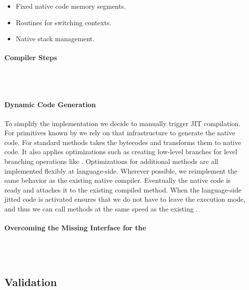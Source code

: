 \begin{itemize}[noitemsep]
	\item Fixed native code memory segments.
	\item Routines for switching contexts.
	\item Native stack management.
\end{itemize}


\paragraph{\NBJ Compiler Steps}
 \\
 \\


\paragraph{Dynamic Code Generation}
To simplify the implementation we decide to manually trigger JIT compilation.
For primitives known by \WF we rely on that infrastructure to generate the native code.
For standard methods \NBJ takes the bytecodes and transforms them to native code.
It also applies optimizations such as creating low-level branches for \ST level branching operations like .
Optimizations for additional methods are all implemented flexibly at language-side.
Wherever possible, we reimplement the same behavior as the existing native \JIT compiler.
Eventually the native code is ready and \B attaches it to the existing compiled method.
When the language-side jitted code is activated \B ensures that we do not have to leave the \JIT execution mode, and thus we can call methods at the same speed as the existing \JIT.


\paragraph{Overcoming the Missing \VM Interface for the \JIT}
\\
\\

\subsection{Validation}

